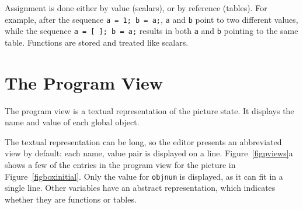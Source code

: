 Assignment is done either by value (scalars), or by reference (tables). For
example, after the sequence \verb+a = 1; b = a;+, {\tt a} and {\tt b} point to
two different values, while the sequence \verb+a = [ ]; b = a;+ results in both
{\tt a} and {\tt b} pointing to the same table. Functions are stored and
treated like scalars.

\section{The Program View}
The program view is a textual representation of the picture state. It displays
the name and value of each global object.

The textual representation can be long, so the editor presents an abbreviated
view by default: each name, value pair is displayed on a line.
Figure~\ref{figpviews}a shows a few of the entries in the program view for the
picture in Figure~\ref{figboxinitial}. Only the value for {\tt objnum} is
displayed, as it can fit in a single line. Other variables have an abstract
representation, which indicates whether they are functions or tables.

